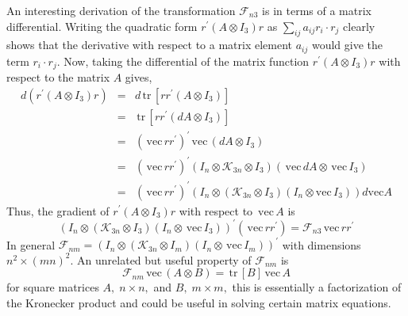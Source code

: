 \documentclass[12pt,thmsa,suthesis,verbatim]{report}
\begin{document}
An interesting derivation of the transformation $\mathcal{F}_{n3}$ is in
terms of a matrix differential. Writing the quadratic form $r^{\prime
}\left( A\otimes I_3\right) r$ as $\sum_{ij}a_{ij}r_i\cdot r_j$ clearly
shows that the derivative with respect to a matrix element $a_{ij}$ would
give the term $r_i\cdot r_j$. Now, taking the differential of the matrix
function $r^{\prime }\left( A\otimes I_3\right) r$ with respect to the
matrix $A$ gives, 
\begin{eqnarray}
d\left( r^{\prime }\left( A\otimes I_3\right) r\right) &=&d\,\mathrm{tr}%
\,\left[ rr^{\prime }\left( A\otimes I_3\right) \right]  \nonumber \\
\ &=&\,\mathrm{tr}\,\left[ rr^{\prime }\left( dA\otimes I_3\right) \right] 
\nonumber \\
\ &=&\left( \,\mathrm{vec}\,rr^{\prime }\right) ^{\prime }\,\mathrm{vec}%
\,\left( dA\otimes I_3\right)  \nonumber \\
\ &=&\left( \,\mathrm{vec}\,rr^{\prime }\right) ^{\prime }\left( I_n\otimes 
\mathcal{K}_{3n}\otimes I_3\right) \left( \,\mathrm{vec}\,dA\otimes \,%
\mathrm{vec}\,I_3\right)  \nonumber \\
\ &=&\left( \,\mathrm{vec}\,rr^{\prime }\right) ^{\prime }\left( I_n\otimes
\left( \mathcal{K}_{3n}\otimes I_3\right) \left( I_n\otimes \mathrm{vec}%
\,I_3\right) \right) d\mathrm{vec}A
\end{eqnarray}
Thus, the gradient of $r^{\prime }\left( A\otimes I_3\right) r$ with respect
to $\,\mathrm{vec}\,A$ is 
\begin{equation}
\left( I_n\otimes \left( \mathcal{K}_{3n}\otimes I_3\right) \left(
I_n\otimes \,\mathrm{vec}\,I_3\right) \right) ^{\prime }\left( \,\mathrm{vec}%
\,rr^{\prime }\right) =\mathcal{F}_{n3}\,\mathrm{vec}\,rr^{\prime }
\end{equation}
In general $\mathcal{F}_{nm}=\left( I_n\otimes \left( \mathcal{K}%
_{3n}\otimes I_m\right) \left( I_n\otimes \,\mathrm{vec}\,I_m\right) \right)
^{\prime }$ with dimensions $n^2\times \left( mn\right) ^2$. An unrelated
but useful property of $\mathcal{F}_{nm}$ is 
\begin{equation}
\mathcal{F}_{nm}\,\mathrm{vec}\,\left( A\otimes B\right) =\,\mathrm{tr}%
\,\left[ B\right] \,\mathrm{vec}\,A
\end{equation}
for square matrices $A,\;n\times n,$ and $B,\;m\times m,$ this is
essentially a factorization of the Kronecker product and could be useful in
solving certain matrix equations.
\end{document}
